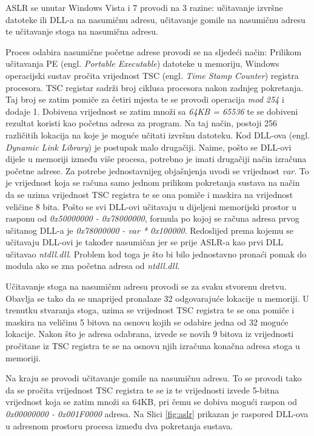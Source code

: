 \documentclass[times, utf8, diplomski, numeric]{fer}
\begin{document}
ASLR se unutar Windows Vista i 7 provodi na 3 razine: učitavanje
izvršne datoteke ili DLL-a na nasumičnu adresu, učitavanje gomile
na nasumičnu adresu te učitavanje stoga na nasumična adresu. 

Proces odabira nasumične početne adrese provodi se na sljedeći
način: Prilikom učitavanja PE (engl. \emph{Portable Executable}) 
datoteke u memoriju, Windows operacijski sustav pročita
vrijednost TSC (engl. \emph{Time Stamp Counter}) registra
procesora. TSC registar sadrži broj ciklusa procesora nakon
zadnjeg pokretanja. Taj broj se zatim pomiče za četiri mjesta te
se provodi operacija \emph{mod 254} i dodaje 1. Dobivena
vrijednost se zatim množi sa \emph{64KB = 65536} te se dobiveni
rezultat koristi kao početna adresa za program. Na taj način,
postoji 256 različitih lokacija na koje je moguće učitati izvršnu
datoteku. Kod DLL-ova (engl. \emph{Dynamic Link Library}) je
postupak malo drugačiji. Naime, pošto se DLL-ovi dijele u
memoriji između više procesa, potrebno je imati drugačiji način
izračuna početne adrese. Za potrebe jednostavnijeg objašnjenja
uvodi se vrijednost \emph{var}. To je vrijednost koja se računa
samo jednom prilikom pokretanja sustava na način da se uzima
vrijednost TSC registra te se ona pomiče i maskira na vrijednost
veličine 8 bita. Pošto se svi DLL-ovi učitavaju u dijeljeni
memorijski prostor u rasponu od \emph{0x50000000 - 0x78000000},
formula po kojoj se računa adresa prvog učitanog DLL-a je
\emph{0x78000000 - var * 0x100000}. Redoslijed prema kojemu se
učitavaju DLL-ovi je također nasumičan jer se prije ASLR-a kao
prvi DLL učitavao \emph{ntdll.dll}. Problem kod toga je što bi
bilo jednostavno pronaći pomak do modula ako se zna početna
adresa od \emph{ntdll.dll}. 

Učitavanje stoga na nasumičnu adresu provodi se za svaku stvorenu
dretvu. Obavlja se tako da se unaprijed pronalaze 32
odgovarajuće lokacije u memoriji. U trenutku stvaranja stoga,
uzima se vrijednost TSC registra te se ona pomiče i maskira na
veličinu 5 bitova na osnovu kojih se odabire jedna od 32 moguće
lokacije. Nakon što je adresa odabrana, izvede se novih 9 bitova
iz vrijednosti pročitane iz TSC registra te se na osnovu njih
izračuna konačna adresa stoga u memoriji.

Na kraju se provodi učitavanje gomile na nasumičnu adresu. To se
provodi tako da se pročita vrijednost TSC registra te se iz
te vrijednosti izvede 5-bitna vrijednost koja se zatim množi sa
64KB, pri čemu se dobiva mogući raspon od \emph{0x00000000 -
0x001F0000} adresa. Na Slici \ref{fig:aslr} prikazan je raspored
DLL-ova u adresnom prostoru procesa između dva pokretanja
sustava.
\end{document}
